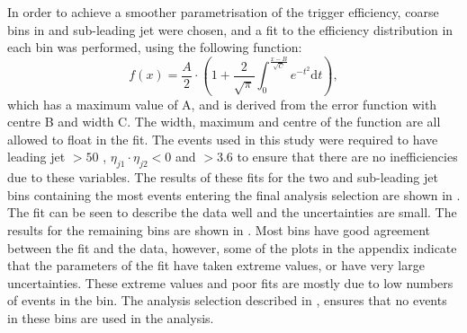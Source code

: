 In order to achieve a smoother parametrisation of the trigger efficiency, coarse bins in \Mjj and sub-leading jet \pt were chosen, and a fit to the \METnoMU efficiency distribution in each bin was performed, using the following function:
\begin{equation}
  \label{eq:parkedtrigfunc}
  f\left(x\right)=\frac{A}{2}\cdot\left(1+ \frac{2}{\sqrt{\pi}}\int_{0}^{\frac{x-B}{\sqrt{C}}}e^{-t^{2}}\mathrm{d}t\right),
\end{equation}
which has a maximum value of A, and is derived from the error function with centre B and width C. The width, maximum and centre of the function are all allowed to float in the fit. The events used in this study were required to have leading jet \pt$>50$ \GeV, $\eta_{j1}\cdot\eta_{j2}<0$ and \detajj$>3.6$ to ensure that there are no inefficiencies due to these variables. The results of these fits for the two \Mjj and sub-leading jet \pt bins containing the most events entering the final analysis selection are shown in . The fit can be seen to describe the data well and the uncertainties are small. The results for the remaining bins are shown in . Most bins have good agreement between the fit and the data, however, some of the plots in the appendix indicate that the parameters of the fit have taken extreme values, or have very large uncertainties. These extreme values and poor fits are mostly due to low numbers of events in the bin. The analysis selection described in , ensures that no events in these bins are used in the analysis.

